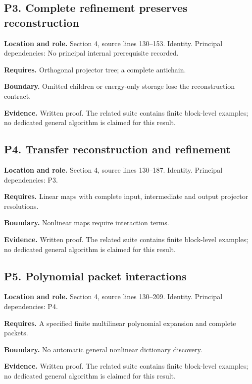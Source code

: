 \documentclass[11pt,letterpaper]{article}
\begin{document}
\par\noindent\begin{minipage}{\textwidth}
\subsection{P3. Complete refinement preserves
reconstruction}\label{p3.-complete-refinement-preserves-reconstruction}

\textbf{Location and role.} Section 4, source lines 130--153. Identity.
Principal dependencies: No principal internal prerequisite recorded.

\textbf{Requires.} Orthogonal projector tree; a complete antichain.

\textbf{Boundary.} Omitted children or energy-only storage lose the
reconstruction contract.

\textbf{Evidence.} Written proof. The related suite contains finite
block-level examples; no dedicated general algorithm is claimed for this
result.
\end{minipage}\par\medskip

\par\noindent\begin{minipage}{\textwidth}
\subsection{P4. Transfer reconstruction and
refinement}\label{p4.-transfer-reconstruction-and-refinement}

\textbf{Location and role.} Section 4, source lines 130--187. Identity.
Principal dependencies: P3.

\textbf{Requires.} Linear maps with complete input, intermediate and
output projector resolutions.

\textbf{Boundary.} Nonlinear maps require interaction terms.

\textbf{Evidence.} Written proof. The related suite contains finite
block-level examples; no dedicated general algorithm is claimed for this
result.
\end{minipage}\par\medskip

\par\noindent\begin{minipage}{\textwidth}
\subsection{P5. Polynomial packet
interactions}\label{p5.-polynomial-packet-interactions}

\textbf{Location and role.} Section 4, source lines 130--209. Identity.
Principal dependencies: P4.

\textbf{Requires.} A specified finite multilinear polynomial expansion
and complete packets.

\textbf{Boundary.} No automatic general nonlinear dictionary discovery.

\textbf{Evidence.} Written proof. The related suite contains finite
block-level examples; no dedicated general algorithm is claimed for this
result.
\end{minipage}\par\medskip
\end{document}
